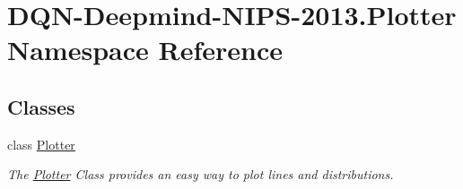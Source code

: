 \hypertarget{namespaceDQN-Deepmind-NIPS-2013_1_1Plotter}{}\section{D\+Q\+N-\/\+Deepmind-\/\+N\+I\+P\+S-\/2013.Plotter Namespace Reference}
\label{namespaceDQN-Deepmind-NIPS-2013_1_1Plotter}
\subsection*{Classes}
\begin{DoxyCompactItemize}
\item 
class \hyperlink{classDQN-Deepmind-NIPS-2013_1_1Plotter_1_1Plotter}{Plotter}
\begin{DoxyCompactList}\small\item\em The \hyperlink{classDQN-Deepmind-NIPS-2013_1_1Plotter_1_1Plotter}{Plotter} Class provides an easy way to plot lines and distributions. \end{DoxyCompactList}\end{DoxyCompactItemize}
